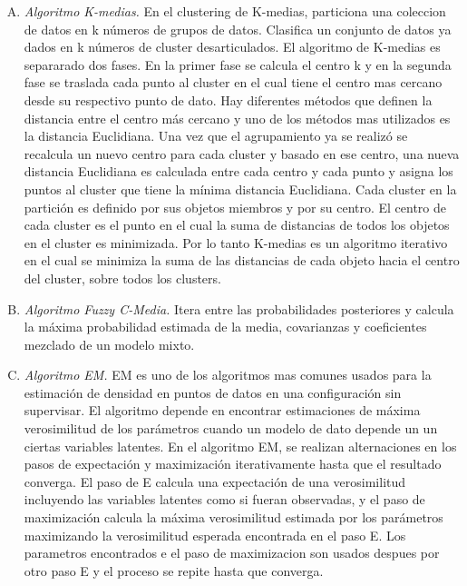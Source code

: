 \documentclass[12pt]{report}
\begin{document}
\begin{enumerate}[A.]
\item \textit{Algoritmo K-medias.} En el clustering de K-medias, particiona una coleccion de datos en k números de grupos de datos. Clasifica un conjunto de datos ya dados en k números de cluster desarticulados. El algoritmo de K-medias es separarado dos fases.
En la primer fase se calcula el centro k y en la segunda fase se traslada cada punto al cluster en el cual tiene el centro mas cercano desde su respectivo punto de dato. Hay diferentes métodos que definen la distancia entre el centro más cercano y uno de los métodos mas utilizados es la distancia Euclidiana. Una vez que el agrupamiento ya se realizó se recalcula un nuevo centro para cada cluster y basado en ese centro, una nueva distancia Euclidiana es calculada entre cada centro y cada punto y asigna los puntos al cluster que tiene la mínima distancia Euclidiana.
Cada cluster en la partición es definido por sus objetos miembros y por su centro. El centro de cada cluster es el punto en el cual la suma de distancias de todos los objetos en el cluster es minimizada. Por lo tanto K-medias es un algoritmo iterativo en el cual se minimiza la suma de las distancias de cada objeto hacia el centro del cluster, sobre todos los clusters.\cite{kmed}

\item \textit{Algoritmo Fuzzy C-Media.} Itera entre las probabilidades posteriores y calcula la máxima probabilidad estimada de la media, covarianzas y coeficientes mezclado de un modelo mixto.

\item \textit{Algoritmo EM.} EM es uno de los algoritmos mas comunes usados para la estimación de densidad en puntos de datos en una configuración sin supervisar. El algoritmo depende en encontrar estimaciones de máxima verosimilitud de los parámetros cuando un modelo de dato depende un un ciertas variables latentes. En el algoritmo EM, se realizan alternaciones en los pasos de expectación y maximización iterativamente hasta que el resultado converga. El paso de E calcula una expectación de una verosimilitud incluyendo las variables latentes como si fueran observadas, y el paso de maximización  calcula la máxima verosimilitud estimada por los parámetros maximizando la verosimilitud esperada encontrada en el paso E. Los parametros encontrados e el paso de maximizacion son usados despues por otro paso E y el proceso se repite hasta que converga.\cite{em}

\end{enumerate}
\end{document}

